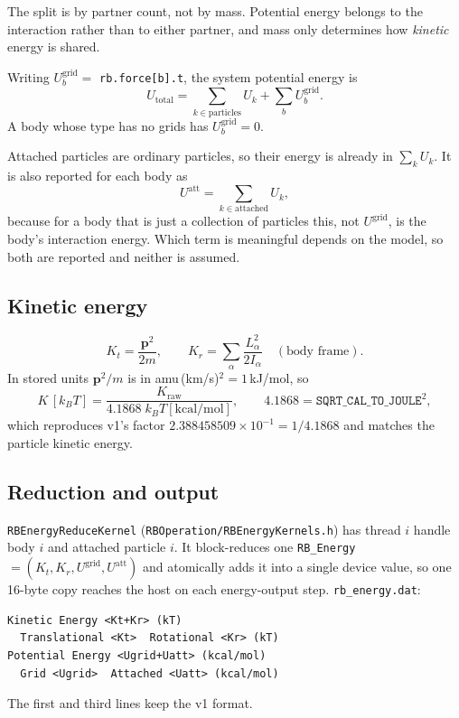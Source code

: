 \documentclass[11pt]{article}
\newcommand{\vb}[1]{\bm{#1}}
\newcommand{\code}[1]{\texttt{#1}}
\begin{document}
The split is by partner count, not by mass. Potential energy belongs to the
interaction rather than to either partner, and mass only determines how
\emph{kinetic} energy is shared.

Writing $U^{\mathrm{grid}}_b=$ \code{rb.force[b].t}, the system potential
energy is
\begin{equation}
  U_{\mathrm{total}}=\sum_{k\in\text{particles}}U_k+\sum_b U^{\mathrm{grid}}_b .
\end{equation}
A body whose type has no grids has $U^{\mathrm{grid}}_b=0$.

Attached particles are ordinary particles, so their energy is already in
$\sum_k U_k$. It is also reported for each body as
\begin{equation}
  U^{\mathrm{att}}=\sum_{k\in\text{attached}}U_k ,
\end{equation}
because for a body that is just a collection of particles this, not
$U^{\mathrm{grid}}$, is the body's interaction energy. Which term is
meaningful depends on the model, so both are reported and neither is assumed.

\subsection{Kinetic energy}

\begin{equation}
  K_t=\frac{\vb p^2}{2m},\qquad
  K_r=\sum_{\alpha}\frac{L_\alpha^2}{2I_\alpha}\quad(\text{body frame}).
\end{equation}
In stored units $\vb p^2/m$ is in amu\,(km/s)$^2=1$\,kJ/mol, so
\begin{equation}
  K\,[k_BT]=\frac{K_{\mathrm{raw}}}{4.1868\;k_BT[\mathrm{kcal/mol}]},
  \qquad 4.1868=\code{SQRT\_CAL\_TO\_JOULE}^2 ,
\end{equation}
which reproduces v1's factor $2.388458509\times10^{-1}=1/4.1868$ and matches
the particle kinetic energy.

\subsection{Reduction and output}

\code{RBEnergyReduceKernel} (\code{RBOperation/RBEnergyKernels.h}) has thread
$i$ handle body $i$ and attached particle $i$. It block-reduces one
\code{RB\_Energy} $=(K_t,K_r,U^{\mathrm{grid}},U^{\mathrm{att}})$ and
atomically adds it into a single device value, so one 16-byte copy reaches the
host on each energy-output step. \code{rb\_energy.dat}:
\begin{verbatim}
Kinetic Energy <Kt+Kr> (kT)
  Translational <Kt>  Rotational <Kr> (kT)
Potential Energy <Ugrid+Uatt> (kcal/mol)
  Grid <Ugrid>  Attached <Uatt> (kcal/mol)
\end{verbatim}
The first and third lines keep the v1 format.
\end{document}
